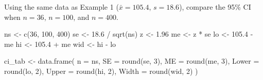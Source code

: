\documentclass[
  12pt,
  letterpaper,
]{book}
\newenvironment{Shaded}{\begin{snugshade}}{\end{snugshade}}
\newcommand{\AttributeTok}[1]{\textcolor[rgb]{0.40,0.45,0.13}{#1}}
\newcommand{\DecValTok}[1]{\textcolor[rgb]{0.68,0.00,0.00}{#1}}
\newcommand{\FloatTok}[1]{\textcolor[rgb]{0.68,0.00,0.00}{#1}}
\newcommand{\FunctionTok}[1]{\textcolor[rgb]{0.28,0.35,0.67}{#1}}
\newcommand{\NormalTok}[1]{\textcolor[rgb]{0.00,0.23,0.31}{#1}}
\newcommand{\OtherTok}[1]{\textcolor[rgb]{0.00,0.23,0.31}{#1}}
\newcommand{\SpecialCharTok}[1]{\textcolor[rgb]{0.37,0.37,0.37}{#1}}
\begin{document}
Using the same data as Example 1 (\(\bar{x} = 105.4\), \(s = 18.6\)),
compare the 95\% CI when \(n = 36\), \(n = 100\), and \(n = 400\).

\begin{tcolorbox}[enhanced jigsaw, arc=.35mm, bottomrule=.15mm, bottomtitle=1mm, breakable, colback=white, colbacktitle=quarto-callout-tip-color!10!white, colframe=quarto-callout-tip-color-frame, coltitle=black, left=2mm, leftrule=.75mm, opacityback=0, opacitybacktitle=0.6, rightrule=.15mm, title={✅ Solution}, titlerule=0mm, toprule=.15mm, toptitle=1mm]

\begin{Shaded}
\begin{Highlighting}[]
\NormalTok{ns   }\OtherTok{\textless{}{-}} \FunctionTok{c}\NormalTok{(}\DecValTok{36}\NormalTok{, }\DecValTok{100}\NormalTok{, }\DecValTok{400}\NormalTok{)}
\NormalTok{se   }\OtherTok{\textless{}{-}} \FloatTok{18.6} \SpecialCharTok{/} \FunctionTok{sqrt}\NormalTok{(ns)}
\NormalTok{z    }\OtherTok{\textless{}{-}} \FloatTok{1.96}
\NormalTok{me   }\OtherTok{\textless{}{-}}\NormalTok{ z }\SpecialCharTok{*}\NormalTok{ se}
\NormalTok{lo   }\OtherTok{\textless{}{-}} \FloatTok{105.4} \SpecialCharTok{{-}}\NormalTok{ me}
\NormalTok{hi   }\OtherTok{\textless{}{-}} \FloatTok{105.4} \SpecialCharTok{+}\NormalTok{ me}
\NormalTok{wid  }\OtherTok{\textless{}{-}}\NormalTok{ hi }\SpecialCharTok{{-}}\NormalTok{ lo}

\NormalTok{ci\_tab }\OtherTok{\textless{}{-}} \FunctionTok{data.frame}\NormalTok{(}
  \AttributeTok{n     =}\NormalTok{ ns,}
  \AttributeTok{SE    =} \FunctionTok{round}\NormalTok{(se, }\DecValTok{3}\NormalTok{),}
  \AttributeTok{ME    =} \FunctionTok{round}\NormalTok{(me, }\DecValTok{3}\NormalTok{),}
  \AttributeTok{Lower =} \FunctionTok{round}\NormalTok{(lo, }\DecValTok{2}\NormalTok{),}
  \AttributeTok{Upper =} \FunctionTok{round}\NormalTok{(hi, }\DecValTok{2}\NormalTok{),}
  \AttributeTok{Width =} \FunctionTok{round}\NormalTok{(wid, }\DecValTok{2}\NormalTok{)}
\NormalTok{)}


\end{Highlighting}
\end{Shaded}
\end{tcolorbox}
\end{document}
